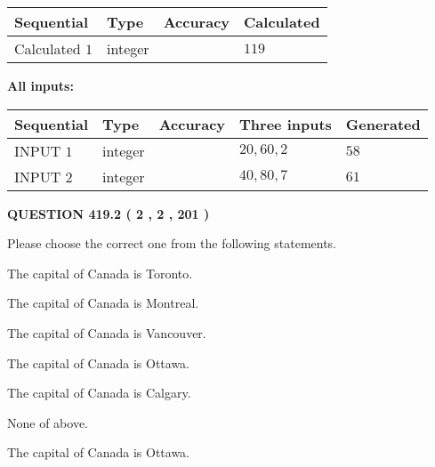 \documentclass[12pt]{article}
\begin{document}
   
  
  
\noindent\begin{tabular}{|l|l|l|l|}
\hline
 Sequential & Type & Accuracy & Calculated \\ 
\hline
 
 
  Calculated $  1 $ & integer &  & 
  $ 119 $ 
 \\  \hline  
 \end{tabular}
   
   
   
   
\noindent\vspace{0.1in}\hspace{-0.08in} {\textbf{\Large{All inputs: }}}
   
   
  
  
\noindent\begin{tabular}{|l|l|l|l|l|}
\hline
 Sequential & Type & Accuracy & Three inputs & Generated \\ 
\hline
 
 
  INPUT $  1 $ & integer &  & $
 20
 , 
 60
 , 
 2
 $ & $ 58 $ 
 \\  \hline  
 
 
  INPUT $  2 $ & integer &  & $
 40
 , 
 80
 , 
 7
 $ & $ 61 $ 
 \\  \hline  
 \end{tabular}
   
   
  
\vspace{0.2in}
  
{\textbf{\Large{QUESTION
419.2 
 ( 2 , 2 , 201 )
}}}
  
  
Please choose the correct one from the following statements.
 
 
The capital of Canada is Toronto.
 
 
The capital of Canada is Montreal.
 
 
The capital of Canada is Vancouver.
 
 
The capital of Canada is Ottawa.
 
 
The capital of Canada is Calgary.
 
 
 None of above.
 
 
\noindent{}
 
 
The capital of Canada is Ottawa.
 
\end{document}
